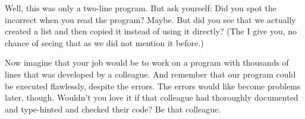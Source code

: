 Well, this was only a two-line program.
But ask yourself:
Did you spot the incorrect  when you read the program?
Maybe.
But did you see that we actually created a list and then copied it instead of using it directly?
(The  I give you, no chance of seeing that as we did not mention it before.)

Now imagine that your job would be to work on a program with thousands of lines that was developed by a colleague.
And remember that our program could be executed flawlessly, despite the errors.
The errors would like become problems later, though.
Wouldn't you love it if that colleague had thoroughly documented and type-hinted and checked their code?
Be that colleague.%
%
%
%
\FloatBarrier%
\endhsection%
%
